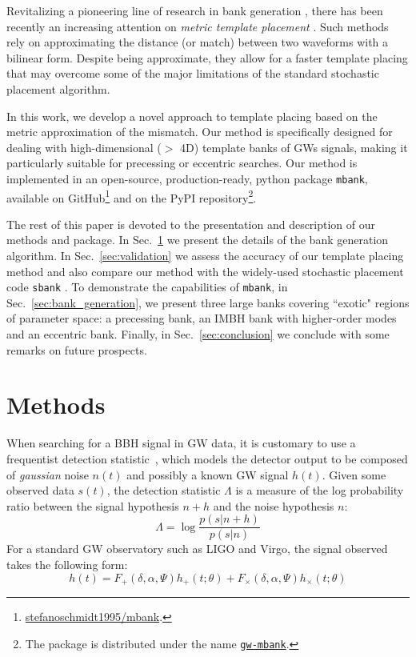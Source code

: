 \documentclass[twocolumn,showpacs,preprintnumbers,nofootinbib,prd,
superscriptaddress,10pt]{revtex4-2}
\begin{document}
Revitalizing a pioneering line of research in bank generation \cite{owen_metric, Messenger:2008ta, Prix:2007ks, Brown:2012qf, Keppel:2013uma}, there has been recently an increasing attention on {\it metric template placement} \cite{Roy:2017oul, 2018cosp...42E2899R, Coogan:2022qxs, Hanna:2022zpk}.
Such methods rely on approximating the distance (or match) between two waveforms with a bilinear form. Despite being approximate, they allow for a faster template placing that may overcome some of the major limitations of the standard stochastic placement algorithm.

In this work, we develop a novel approach to template placing based on the metric approximation of the mismatch.
Our method is specifically designed for dealing with high-dimensional ($>$ 4D) template banks of GWs signals, making it particularly suitable for precessing or eccentric searches.
Our method is implemented in an open-source, production-ready, python package \texttt{mbank}, available on GitHub\footnote{
\href{https://github.com/stefanoschmidt1995/mbank}{stefanoschmidt1995/mbank}.}
and on the PyPI repository\footnote{
The package is distributed under the name \texttt{\href{https://pypi.org/project/gw-mbank/}{gw-mbank}}.
}.

The rest of this paper is devoted to the presentation and description of our methods and package.
In Sec.~\ref{sec:methods} we present the details of the bank generation algorithm.
In Sec.~\ref{sec:validation} we assess the accuracy of our template placing method and also compare our method with the widely-used stochastic placement code \texttt{sbank} \cite{Ajith:2012mn}.
To demonstrate the capabilities of \texttt{mbank}, in Sec.~\ref{sec:bank_generation}, we present three large banks covering ``exotic" regions of parameter space: a precessing bank, an IMBH bank with higher-order modes and an eccentric bank.
Finally, in Sec.~\ref{sec:conclusion} we conclude with some remarks on future prospects.

\section{Methods} \label{sec:methods}

When searching for a BBH signal in GW data, it is customary to use a frequentist detection statistic~\cite{Creighton_book, Maggiore:2007ulw, Harry:2016ijz, Harry:2017weg}, which models the detector output to be composed of {\it gaussian} noise $n(t)$ and possibly a known GW signal $h(t)$.
Given some observed data $s(t)$, the detection statistic $\Lambda$ is a measure of the log probability ratio between the signal hypothesis $n+h$ and the noise hypothesis $n$:
\begin{equation}\label{eq:LL}
	\Lambda = \log\frac{p(s|n+h)}{p(s| n)}
\end{equation}
For a standard GW observatory such as LIGO and Virgo, the signal observed takes the following form:
\begin{equation}\label{eq:signal_model}
	h(t) = F_+(\delta, \alpha, \Psi) h_+(t;\theta) + F_\times(\delta, \alpha, \Psi) h_\times(t;\theta)
\end{equation}
\end{document}
